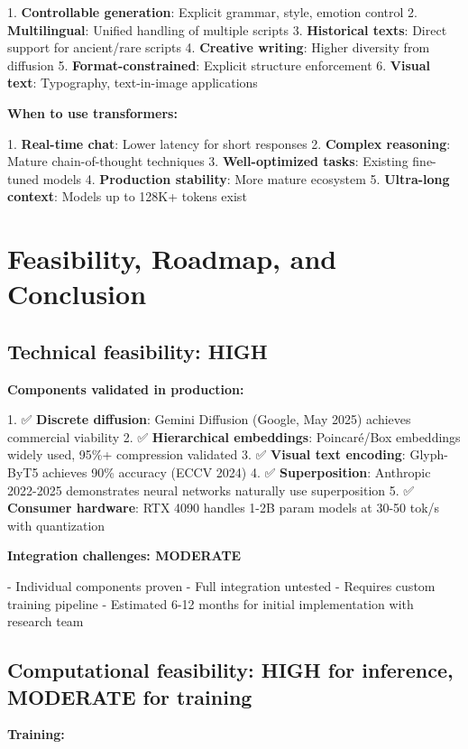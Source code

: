 \documentclass[11pt]{article}
\begin{document}
1. \textbf{Controllable generation}: Explicit grammar, style, emotion control
2. \textbf{Multilingual}: Unified handling of multiple scripts
3. \textbf{Historical texts}: Direct support for ancient/rare scripts
4. \textbf{Creative writing}: Higher diversity from diffusion
5. \textbf{Format-constrained}: Explicit structure enforcement
6. \textbf{Visual text}: Typography, text-in-image applications

\textbf{When to use transformers:}

1. \textbf{Real-time chat}: Lower latency for short responses
2. \textbf{Complex reasoning}: Mature chain-of-thought techniques
3. \textbf{Well-optimized tasks}: Existing fine-tuned models
4. \textbf{Production stability}: More mature ecosystem
5. \textbf{Ultra-long context}: Models up to 128K+ tokens exist

\section{Feasibility, Roadmap, and Conclusion}

\subsection{Technical feasibility: HIGH}

\textbf{Components validated in production:}

1. ✅ \textbf{Discrete diffusion}: Gemini Diffusion (Google, May 2025) achieves commercial viability
2. ✅ \textbf{Hierarchical embeddings}: Poincaré/Box embeddings widely used, 95\%+ compression validated
3. ✅ \textbf{Visual text encoding}: Glyph-ByT5 achieves 90\% accuracy (ECCV 2024)
4. ✅ \textbf{Superposition}: Anthropic 2022-2025 demonstrates neural networks naturally use superposition
5. ✅ \textbf{Consumer hardware}: RTX 4090 handles 1-2B param models at 30-50 tok/s with quantization

\textbf{Integration challenges: MODERATE}

- Individual components proven
- Full integration untested
- Requires custom training pipeline
- Estimated 6-12 months for initial implementation with research team

\subsection{Computational feasibility: HIGH for inference, MODERATE for training}

\textbf{Training:}
\end{document}
